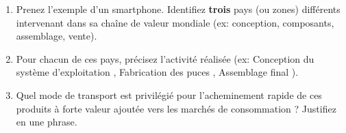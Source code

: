 \documentclass[11pt]{article}
\begin{document}
\begin{exercice}
\begin{enumerate}
    \item Prenez l'exemple d'un smartphone. Identifiez \textbf{trois} pays (ou zones) différents intervenant dans sa chaîne de valeur mondiale (ex: conception, composants, assemblage, vente).
    \item Pour chacun de ces pays, précisez l'activité réalisée (ex: \og Conception du système d'exploitation \fg{}, \og Fabrication des puces \fg{}, \og Assemblage final \fg{}).
    \item Quel mode de transport est privilégié pour l'acheminement rapide de ces produits à forte valeur ajoutée vers les marchés de consommation ? Justifiez en une phrase.
\end{enumerate}
\end{exercice}
\end{document}
